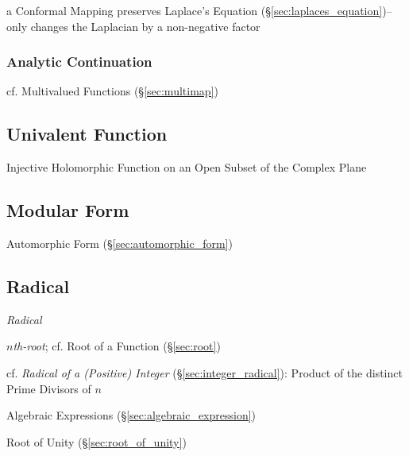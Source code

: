 a Conformal Mapping preserves Laplace's Equation
(\S\ref{sec:laplaces_equation})-- only changes the Laplacian by a non-negative
factor



\subsubsection{Analytic Continuation}\label{sec:analytic_continuation}

cf. Multivalued Functions (\S\ref{sec:multimap})



\subsection{Univalent Function}\label{sec:univalent_function}

Injective Holomorphic Function on an Open Subset of the Complex Plane



\subsection{Modular Form}\label{sec:modular_form}

Automorphic Form (\S\ref{sec:automorphic_form})



\subsection{Radical}\label{sec:radical}

\emph{Radical}

\emph{$n$th-root}; cf. Root of a Function (\S\ref{sec:root})

cf. \emph{Radical of a (Positive) Integer} (\S\ref{sec:integer_radical}):
Product of the distinct Prime Divisors of $n$

Algebraic Expressions (\S\ref{sec:algebraic_expression})

Root of Unity (\S\ref{sec:root_of_unity})



